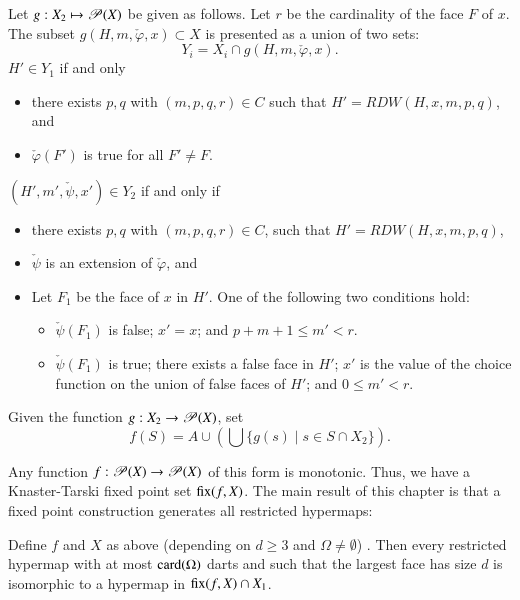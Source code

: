 \begin{definition}[g] Let $g:X_2 \mapsto {\mathscr P}(X)$ be given as
  follows.  Let $r$ be the cardinality of the face $F$ of $x$.  The
  subset $g(H,m,\check\varphi,x)\subset X$ is presented as a union of two
  sets:
\begin{displaymath}
   Y_i = X_i \cap g(H,m,\check\varphi,x).
\end{displaymath}
 $H'\in Y_1$ if and only 
\begin{itemize}
\item there exists
$p,q$ with $(m,p,q,r)\in C$ such that $H'=RDW(H,x,m,p,q)$,
and 
\item $\check\varphi(F')$ is true for all $F'\ne F$.
\end{itemize}
 $(H',m',\check\psi,x')\in Y_2$ if and only if
\begin{itemize}
\item there exists $p,q$ with $(m,p,q,r)\in C$, such that $H'=RDW(H,x,m,p,q)$,
\item  $\check\psi$ is an extension of
$\check\varphi$, and 
\item Let $F_1$ be the face of $x$ in $H'$.  One of the following two
  conditions hold:
\begin{itemize}
\item $\check\psi(F_1)$ is false;  $x' = x$; and  $p+m+1 \le m' < r$.
\item $\check\psi(F_1)$ is true; there exists a false face in $H'$; $x'$ is
  the value of the choice function on the union of false faces of
  $H'$; and $0 \le m' < r$.
\end{itemize}
\end{itemize}
\end{definition}


\begin{definition}[f]
Given the function 
$g:X_2 \to {\mathscr P}(X)$, set 
\begin{displaymath}f(S) = A \cup (\bigcup \{g(s) \mid s\in S\cap
X_2\}).\end{displaymath}
%
\end{definition}

Any function $f :{\mathscr P}(X)\to {\mathscr P}(X)$ of this form is
monotonic.  Thus, we have a Knaster-Tarski fixed point set
${\operatorname{fix}}(f,X)$.  The main result of this chapter is that a fixed
point construction generates all restricted hypermaps:

\begin{theorem}  
\label{lemma:algorithm}
Define $f $ and $X$ as above (depending on $d\ge 3$ and $\Omega\ne
\emptyset$) .    Then every restricted hypermap with at
most ${\operatorname{card}}(\Omega)$ darts and such that the largest face has size  $d$
is isomorphic to a hypermap in ${\operatorname{fix}}(f,X)\cap X_1$.
\end{theorem}


